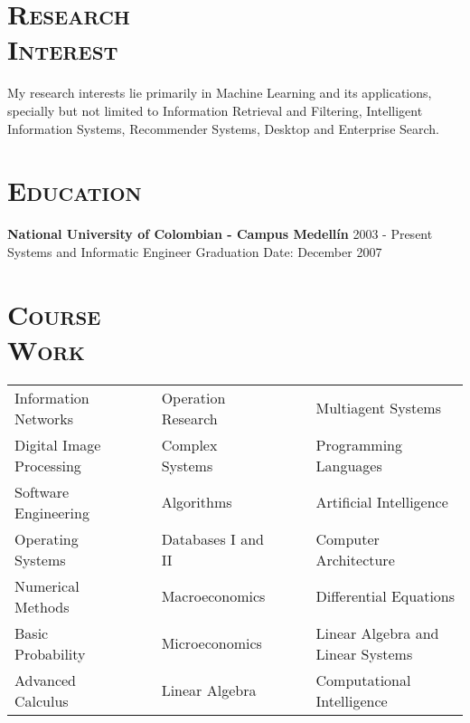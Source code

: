 \begin{resume}


\section{\textsc{Research\\ Interest}}
My research interests lie primarily in Machine Learning and its applications, specially but  not limited to Information Retrieval and Filtering, Intelligent Information Systems, Recommender Systems, Desktop and Enterprise Search.
\newline

\section{\textsc{Education}}
\textbf{National University of Colombian - Campus Medell\'{i}n} \hfill 2003 - Present \\
{\large Systems and Informatic Engineer} \hfill Graduation Date: December 2007\\

\section{\textsc{Course\\ Work}}
  \begin{tabular}{lllll}
Information Networks   & \ \ &  Operation Research   & \ \ &
Multiagent Systems  \\ 
Digital Image Processing     & \ \ & Complex Systems  & \ \ & Programming Languages \\
Software Engineering   & \ \ & Algorithms          & \ \ & Artificial Intelligence     \\
Operating Systems      & \ \ & Databases I and II          & \ \ & Computer Architecture \\
Numerical Methods      & \ \ & Macroeconomics       & \ \ & Differential Equations      \\
Basic Probability      & \ \ & Microeconomics      & \ \ & Linear Algebra and Linear Systems      \\
Advanced Calculus      & \ \ & Linear Algebra    & \ \ & Computational Intelligence   \\
\end{tabular}
\newline




\end{resume}
